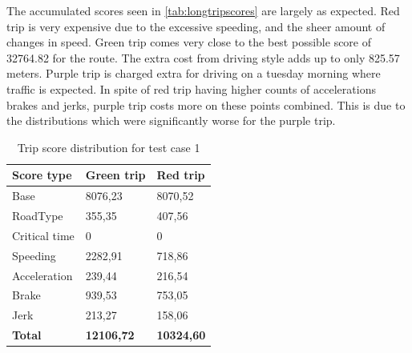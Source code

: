 The accumulated scores seen in \ref{tab:longtripscores} are largely as expected. Red trip is very expensive due to the excessive speeding, and the sheer amount of changes in speed. Green trip comes very close to the best possible score of 32764.82 for the route. The extra cost from driving style adds up to only 825.57 meters. Purple trip is charged extra for driving on a tuesday morning where traffic is expected. In spite of red trip having higher counts of accelerations brakes and jerks, purple trip costs more on these points combined. This is due to the distributions which were significantly worse for the purple trip.

\begin{table}
    \begin{tabular}{lll}
    \textbf{Score type} & \textbf{Green trip} & \textbf{Red trip} \\ \hline
    Base                & 8076,23             & 8070,52           \\
    RoadType            & 355,35              & 407,56            \\
    Critical time       & 0                   & 0                 \\
    Speeding            & 2282,91             & 718,86            \\
    Acceleration        & 239,44              & 216,54            \\
    Brake               & 939,53              & 753,05            \\
    Jerk                & 213,27              & 158,06            \\ \hline
    \textbf{Total}      & \textbf{12106,72}   & \textbf{10324,60} \\ \hline
    \end{tabular}
    \caption{Trip score distribution for test case 1}
    \label{tab:shorttripscores}
\end{table}

